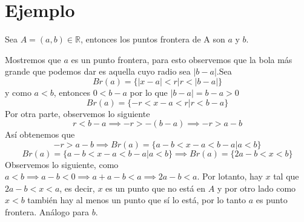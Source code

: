 \documentclass[letterpaper]{article}
\providecommand{\abs}[1]{\lvert#1\rvert}
\newcommand{\R}{\mathds{R}}
\renewcommand{\*}{\cdot}
\theoremstyle{definition}
\begin{document}
\section*{Ejemplo}
Sea $ A = (a,b)  \in \R$, entonces los puntos frontera de A son $ a  $ y $ b $.

Mostremos que $ a $ es un punto frontera, para esto observemos que la bola más grande que podemos dar es aquella cuyo radio sea $ \abs{b -a} $.Sea 
\[ Br(a) = \{ \abs{x -a} < r | r < \abs{b-a} \} \] y como $ a<b $, entonces $ 0 < b -a $ por lo que $ \abs{b-a} = b-a >0 $
\[ Br(a)  = \{ -r < x-a < r | r < b-a \} \]
Por otra parte, observemos lo siguiente
\[ r < b-a \implies -r > -(b-a) \implies -r > a-b \]
Así obtenemos que
\[  -r > a-b \implies Br(a) = \{ a-b < x-a < b-a | a<b \} \]
\[ Br(a) = \{ a-b < x-a < b-a | a<b \} \implies Br(a) = \{ 2a-b < x < b \} \]Observemos lo siguiente, como $ a< b  \implies a-b < 0 \implies a +a -b < a  \implies 2a - b < a$. Por lotanto, hay $ x $ tal que $ 2a-b < x < a $, es decir, $ x $ es un punto que no está en $ A $ y por otro lado como $ x<b $ también hay al menos un punto que sí lo está, por lo tanto $ a $ es punto frontera. Análogo  para $ b $.
\end{document}
